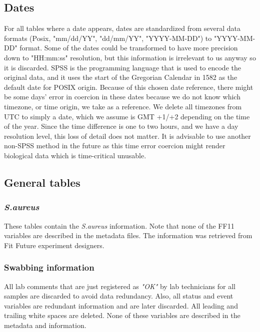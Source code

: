 \subsection{Dates}

For all tables where a date appears, dates are standardized from several data formats (Posix, "mm/dd/YY", "dd/mm/YY", "YYYY-MM-DD") to "YYYY-MM-DD" format. Some of the dates could be transformed to have more precision down to "HH:mm:ss" resolution, but this information is irrelevant to us anyway so it is discarded. SPSS is the programming language that is used to encode the original data, and it uses the start of the Gregorian Calendar in 1582 as the default date for POSIX origin. Because of this chosen date reference, there might be some days' error in coercion in these dates because we do not know which timezone, or time origin, we take as a reference. We delete all timezones from UTC to simply a date, which we assume is GMT +1/+2 depending on the time of the year. Since the time difference is one to two hours, and we have a day resolution level, this loss of detail does not matter. It is advisable to use another non-SPSS method in the future as this time error coercion might render biological data which is time-critical unusable.

\subsection{General tables}

\subsubsection{\textit{S.aureus}}

These tables contain the \textit{S.aureus} information. Note that none of the FF11 variables are described in the metadata files. The information was retrieved from Fit Future experiment designers.

\subsubsection{Swabbing information}

All lab comments that are just registered as \textit{"OK"} by lab technicians for all samples are discarded to avoid data redundancy. Also, all status and event variables are redundant information and are later discarded. All leading and trailing white spaces are deleted. None of these variables are described in the metadata and information.

